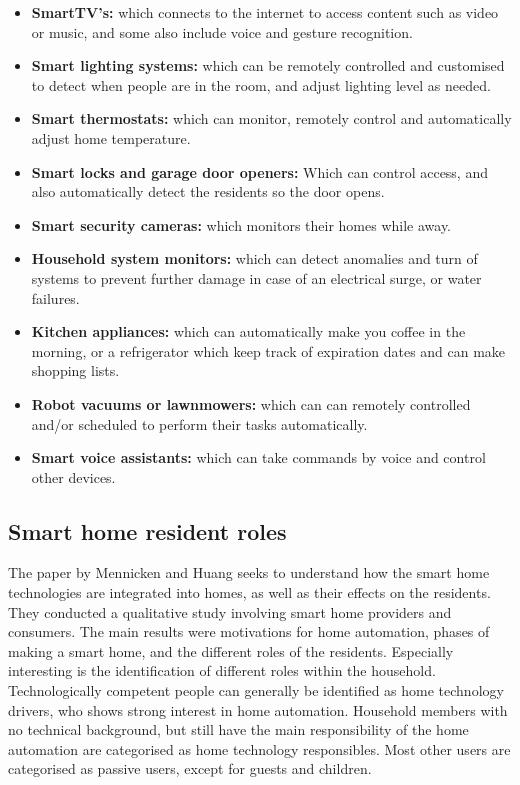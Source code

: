 \begin{itemize}
    \item \textbf{SmartTV's: } which connects to the internet to access content such as video or music, and some also include voice and gesture recognition. 
    \item \textbf{Smart lighting systems: } which can be remotely controlled and customised to detect when people are in the room, and adjust lighting level as needed. 
    \item \textbf{Smart thermostats: } which can monitor, remotely control and automatically adjust home temperature. 
    \item \textbf{Smart locks and garage door openers: } Which can control access, and also automatically detect the residents so the door opens. 
    \item \textbf{Smart security cameras: } which monitors their homes while away. 
    \item \textbf{Household system monitors:} which can detect anomalies and turn of systems to prevent further damage in case of an electrical surge, or water failures. 
    \item \textbf{Kitchen appliances: } which can automatically make you coffee in the morning, or a refrigerator which keep track of expiration dates and can make shopping lists. 
    \item \textbf{Robot vacuums or lawnmowers: } which can can remotely controlled and/or scheduled to perform their tasks automatically. 
    \item \textbf{Smart voice assistants: } which can take commands by voice and control other devices.
\end{itemize}

\subsection{Smart home resident roles}
The paper by Mennicken and Huang \cite{Mennicken2012} seeks to understand how the smart home technologies are integrated into homes, as well as their effects on the residents. They conducted a qualitative study involving smart home providers and consumers. The main results were motivations for home automation, phases of making a smart home, and the different roles of the residents. Especially interesting is the identification of different roles within the household. Technologically competent people can generally be identified as home technology drivers, who shows strong interest in home automation. Household members with no technical background, but still have the main responsibility of the home automation are categorised as home technology responsibles. Most other users are categorised as passive users, except for guests and children. 

